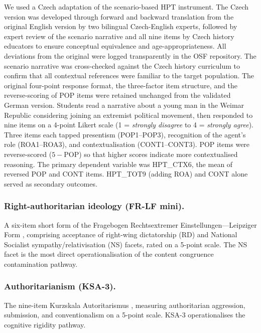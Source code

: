 \documentclass[pdflatex,sn-apa]{sn-jnl}%
\begin{document}
We used a Czech adaptation of the \citet{Hartmann2008} scenario-based HPT instrument. The Czech version was developed through forward and backward translation from the original English version by two bilingual Czech-English experts, followed by expert review of the scenario narrative and all nine items by Czech history educators to ensure conceptual equivalence and age-appropriateness. All deviations from the original were logged transparently in the OSF repository. The scenario narrative was cross-checked against the Czech history curriculum to confirm that all contextual references were familiar to the target population. The original four-point response format, the three-factor item structure, and the reverse-scoring of POP items were retained unchanged from the validated German version. Students read a narrative about a young man in the Weimar Republic considering joining an extremist political movement, then responded to nine items on a 4-point Likert scale (1 = \emph{strongly disagree} to 4 = \emph{strongly agree}). Three items each tapped presentism (POP1--POP3), recognition of the agent's role (ROA1--ROA3), and contextualisation (CONT1--CONT3). POP items were reverse-scored ($5 - \text{POP}$) so that higher scores indicate more contextualised reasoning. The primary dependent variable was HPT\_CTX6, the mean of reversed POP and CONT items. HPT\_TOT9 (adding ROA) and CONT alone served as secondary outcomes.

\subsubsection{Right-authoritarian ideology (FR-LF mini).}\label{subsubsec:frlf}

A six-item short form of the Fragebogen Rechtsextremer Einstellungen---Leipziger Form \citep{Decker2013}, comprising acceptance of right-wing dictatorship (RD) and National Socialist sympathy/relativisation (NS) facets, rated on a 5-point scale. The NS facet is the most direct operationalisation of the content congruence contamination pathway.

\subsubsection{Authoritarianism (KSA-3).}\label{subsubsec:ksa}

The nine-item Kurzskala Autoritarismus \citep{Beierlein2014}, measuring authoritarian aggression, submission, and conventionalism on a 5-point scale. KSA-3 operationalises the cognitive rigidity pathway.
\end{document}
